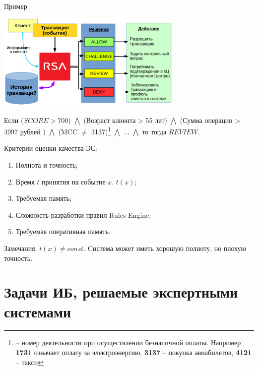 \begin{frame}{Пример}
    
    \includegraphics[width=9cm]{../pic/expert_system_rsa.png}
	
	\small
	Если 
	($SCORE > 700$) $\bigwedge$
	(Возраст клиента > 55 лет) $\bigwedge$
	(Сумма операции > 4997 рублей ) $\bigwedge$
	(MCC $\neq$ 3137)\footnote{ -- номер деятельности при осуществлении безналичной оплаты. Например \textbf{1731} означает оплату за электроэнергию, \textbf{3137} -- покупка авиабилетов, \textbf{4121} -- такси} $\bigwedge$
	... $\bigwedge$
	то тогда  $REVIEW$.
	
\end{frame}






\begin{frame}
	Критерии оценки качества ЭС:
	\begin{enumerate}
		\item Полнота и точность;
		\item Время $t$ принятия на событие $x$. $t(x)$;
		\item Требуемая память;
		\item Сложность разработки правил Rules Engine;
		\item Требуемая оперативная память.
	\end{enumerate}
	
	\begin{block}{Замечания.}
		$t(x) \neq const$. Cистема может иметь хорошую полноту, но плохую точность.
	\end{block}
\end{frame}

\section{Задачи ИБ, решаемые экспертными системами}\label{section:is_tasks}
	
